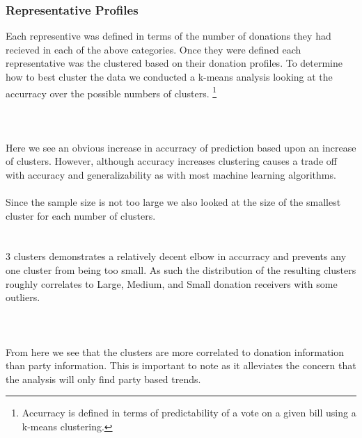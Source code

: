 \documentclass[journal]{IEEEtran}
\begin{document}
\subsubsection{Representative Profiles}
Each representive was defined in terms of the number of donations they had recieved in each of the above
categories. Once they were defined each representative was the clustered based on their donation profiles.
To determine how to best cluster the data we conducted a k-means analysis looking at the accurracy over the 
possible numbers of clusters.
\footnote{Accurracy is defined in terms of predictability of a vote on a given bill using a k-means clustering.}\\\\
\\
\\Here we see an obvious increase in accurracy of prediction based upon an increase of clusters. However, although accuracy increases
clustering causes a trade off with accuracy and generalizability as with most machine learning algorithms.\\\\
Since the sample size is not too large we also looked at the size of the smallest cluster for each number of clusters.\\
\\
\\3 clusters demonstrates a relatively decent elbow in accurracy and prevents any one cluster from being too small. As such
the distribution of the resulting clusters roughly correlates to Large, Medium, and Small donation receivers with some outliers.\\\\
\\\\
From here we see that the clusters are more correlated to donation information than party information. This is important to note
as it alleviates the concern that the analysis will only find party based trends.
\end{document}
